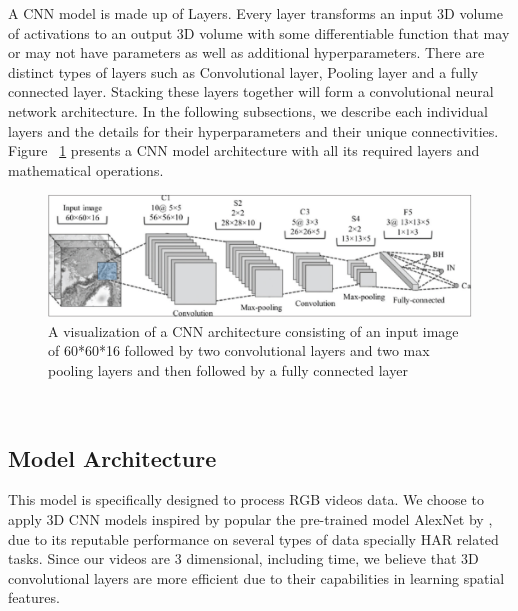 A CNN model is made up of Layers. Every layer transforms an input 3D volume of activations to an output 3D volume with some differentiable function that may or may not have parameters as well as additional hyperparameters. There are distinct types of layers such as Convolutional layer, Pooling layer and a fully connected layer. Stacking these layers together will form a convolutional neural network architecture. In the following subsections, we describe each individual layers and the details for their hyperparameters and their unique connectivities. Figure ~\ref{fig:standardCNN} presents a CNN model architecture with all its required layers and mathematical operations.
\begin{figure}[th]
\centering
\includegraphics{Figures/cnn}
\decoRule
\caption[A visualization of a CNN architecture consisting of an input image of 60*60*16 followed by two convolutional layers and two max pooling layers and then followed by a fully connected layer \parencite{haj2017classifications}]{A visualization of a CNN architecture consisting of an input image of 60*60*16 followed by two convolutional layers and two max pooling layers and then followed by a fully connected layer \parencite{haj2017classifications}}
\label{fig:standardCNN}
\end{figure}\\

\subsection{Model Architecture}
This model is specifically designed to process RGB videos data. We choose to apply 3D CNN models inspired by popular the pre-trained model AlexNet by \cite{krizhevsky2012imagenet}, due to its reputable performance on several types of data specially HAR related tasks. Since our videos are 3 dimensional, including time, we believe that 3D convolutional layers are more efficient due to their capabilities in learning spatial features.\\

